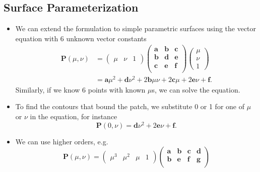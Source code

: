\documentclass[twocolumn,landscape,10pt]{article}
\theoremstyle{definition}
\begin{document}
\subsection{Surface Parameterization}

\begin{itemize}
    \item 
        We can extend the formulation to simple parametric surfaces using the vector
        equation with 6 unknown vector constants
        \begin{align*}
            \mathbf{P}(\mu,\nu)
            & =
            \begin{pmatrix}
                \mu & \nu & 1
            \end{pmatrix} 
            \begin{pmatrix}
                \mathbf{a} & \mathbf{b} & \mathbf{c} \\
                \mathbf{b} & \mathbf{d} & \mathbf{e} \\
                \mathbf{c} & \mathbf{e} & \mathbf{f} \\
            \end{pmatrix} 
            \begin{pmatrix}
                \mu \\
                \nu \\
                1
            \end{pmatrix} \\
            & =
            \mathbf{a}\mu^2+\mathbf{d}\nu^2+2\mathbf{b}\mu\nu+2\mathbf{c}\mu+2\mathbf{e}\nu+\mathbf{f}.
        \end{align*} 
        Similarly, if we know 6 points with known $\mu$s, we can solve the equation.
    \item 
        To find the contours that bound the patch, we substitute 0 or 1 for one of $\mu$
        or $\nu$ in the equation, for instance
        \[
            \mathbf{P}(0,\nu)=\mathbf{d}\nu^2+2\mathbf{e}\nu+\mathbf{f}.
        \]
    \item 
        We can use higher orders, e.g.
        \[
            \mathbf{P}(\mu,\nu)
            =
            \begin{pmatrix}
                \mu^3 & \mu^2 & \mu & 1
            \end{pmatrix} 
            \begin{pmatrix}
                \mathbf{a} & \mathbf{b} & \mathbf{c} & \mathbf{d} \\
                \mathbf{b} & \mathbf{e} & \mathbf{f} & \mathbf{g} \\

\end{pmatrix}\]
\end{itemize}
\end{document}

